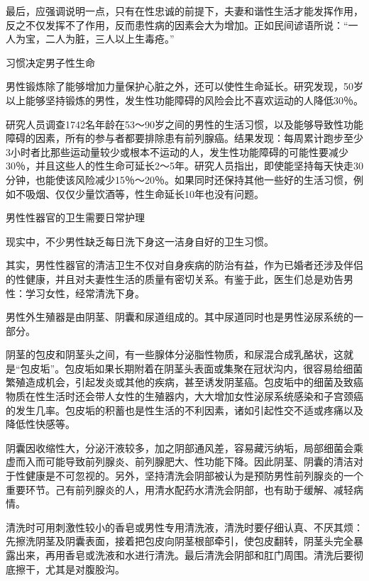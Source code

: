 \documentclass[12pt,UTF8,openany]{ctexbook}
\begin{document}
最后，应强调说明一点，只有在性忠诚的前提下，夫妻和谐性生活才能发挥作用，反之不仅发挥不了作用，反而患性病的因素会大为增加。正如民间谚语所说：“一人为宝，二人为脏，三人以上生毒疮。”





习惯决定男子性生命


男性锻炼除了能够增加力量保护心脏之外，还可以使性生命延长。研究发现，50岁以上能够坚持锻炼的男性，发生性功能障碍的风险会比不喜欢运动的人降低30％。

研究人员调查1742名年龄在53～90岁之间的男性的生活习惯，以及能够导致性功能障碍的因素，所有的参与者都要排除患有前列腺癌。结果发现：每周累计跑步至少3小时者比那些运动量较少或根本不运动的人，发生性功能障碍的可能性要减少30％，并且这些人的性生命可延长2～5年。研究人员指出，即使能坚持每天快走30分钟，也能使该风险减少15％～20％。如果同时还保持其他一些好的生活习惯，例如不吸烟、仅仅少量饮酒等，性生命延长10年也没有问题。





男性性器官的卫生需要日常护理


现实中，不少男性缺乏每日洗下身这一洁身自好的卫生习惯。

其实，男性性器官的清洁卫生不仅对自身疾病的防治有益，作为已婚者还涉及伴侣的性健康，并且对夫妻性生活的质量有密切关系。有鉴于此，医生们总是劝告男性：学习女性，经常清洗下身。

男性外生殖器是由阴茎、阴囊和尿道组成的。其中尿道同时也是男性泌尿系统的一部分。

阴茎的包皮和阴茎头之间，有一些腺体分泌脂性物质，和尿混合成乳酪状，这就是“包皮垢”。包皮垢如果长期附着在阴茎头表面或集聚在冠状沟内，很容易给细菌繁殖造成机会，引起发炎或其他的疾病，甚至诱发阴茎癌。包皮垢中的细菌及致癌物质在性生活时还会带人女性的生殖器内，大大增加女性泌尿系统感染和子宫颈癌的发生几率。包皮垢的积蓄也是性生活的不利因素，诸如引起性交不适或疼痛以及降低性快感等。

阴囊因收缩性大，分泌汗液较多，加之阴部通风差，容易藏污纳垢，局部细菌会乘虚而入而可能导致前列腺炎、前列腺肥大、性功能下降。因此阴茎、阴囊的清洁对于性健康是不可忽视的。另外，坚持清洗会阴部被认为是预防男性前列腺炎的一个重要环节。己有前列腺炎的人，用清水配药水清洗会阴部，也有助于缓解、减轻病情。

清洗时可用刺激性较小的香皂或男性专用清洗液，清洗时要仔细认真、不厌其烦：先擦洗阴茎及阴囊表面，接着把包皮向阴茎根部牵引，使包皮翻转，阴茎头完全暴露出来，再用香皂或洗液和水进行清洗。最后清洗会阴部和肛门周围。清洗后要彻底擦干，尤其是对腹股沟。
\end{document}
